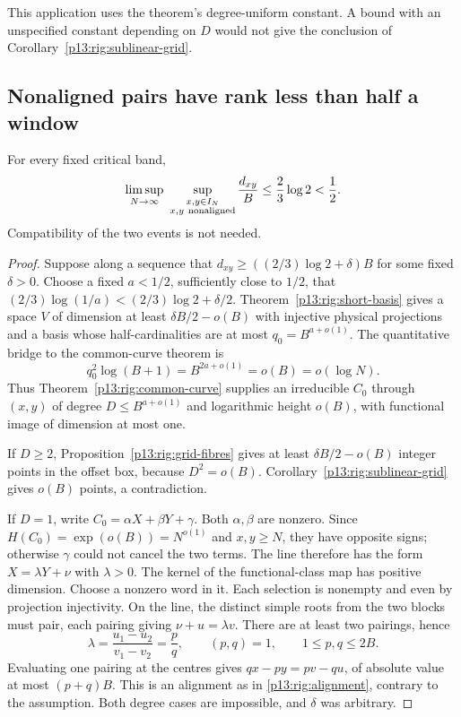 This application uses the theorem's degree-uniform constant.
A bound with an unspecified constant depending on $D$ would
not give the conclusion of Corollary~\ref{p13:rig:sublinear-grid}.

\subsection{Nonaligned pairs have rank less than half a window}

\begin{theorem}
\label{p13:rig:nonaligned}
For every fixed critical band,
\begin{equation}
 \limsup_{N\to\infty}\ 
 \sup_{\substack{x,y\in I_N\\x,y\ {\rm nonaligned}}}
             \frac{d_{xy}}B
       \le\frac23\log2<\frac12.
 \label{p13:rig:nonaligned-bound}
\end{equation}
Compatibility of the two events is not needed.
\end{theorem}

\begin{proof}
Suppose along a sequence that
$d_{xy}\ge((2/3)\log2+\delta)B$ for some fixed
$\delta>0$.  Choose a fixed $a<1/2$, sufficiently close to
$1/2$, that
$(2/3)\log(1/a)<(2/3)\log2+\delta/2$.
Theorem~\ref{p13:rig:short-basis} gives a space $V$
of dimension at least $\delta B/2-o(B)$ with injective
physical projections and a basis whose half-cardinalities
are at most $q_0=B^{a+o(1)}$.  The quantitative bridge to
the common-curve theorem is
\begin{equation}
              q_0^2\log(B+1)=B^{2a+o(1)}=o(B)=o(\log N).
 \label{p13:rig:threshold-bridge}
\end{equation}
Thus Theorem~\ref{p13:rig:common-curve} supplies an
irreducible $C_0$ through $(x,y)$ of degree
$D\le B^{a+o(1)}$ and logarithmic height $o(B)$, with
functional image of dimension at most one.

If $D\ge2$, Proposition~\ref{p13:rig:grid-fibres} gives
at least $\delta B/2-o(B)$ integer points in the offset
box, because $D^2=o(B)$.  Corollary~\ref{p13:rig:sublinear-grid}
gives $o(B)$ points, a contradiction.

If $D=1$, write $C_0=\alpha X+\beta Y+\gamma$.
Both $\alpha,\beta$ are nonzero.  Since
$H(C_0)=\exp(o(B))=N^{o(1)}$ and $x,y\ge N$, they have
opposite signs; otherwise $\gamma$ could not cancel the
two terms.  The line therefore has the form
$X=\lambda Y+\nu$ with $\lambda>0$.
The kernel of the functional-class map has positive
dimension.  Choose a nonzero word in it.  Each selection
is nonempty and even by projection injectivity.  On the
line, the distinct simple roots from the two blocks must
pair, each pairing giving $\nu+u=\lambda v$.
There are at least two pairings, hence
\[
 \lambda=\frac{u_1-u_2}{v_1-v_2}=\frac pq,
 \qquad (p,q)=1,\qquad 1\le p,q\le2B.
\]
Evaluating one pairing at the centres gives
$qx-py=pv-qu$, of absolute value at most $(p+q)B$.
This is an alignment as in \eqref{p13:rig:alignment},
contrary to the assumption.  Both degree cases are
impossible, and $\delta$ was arbitrary.
\end{proof}

